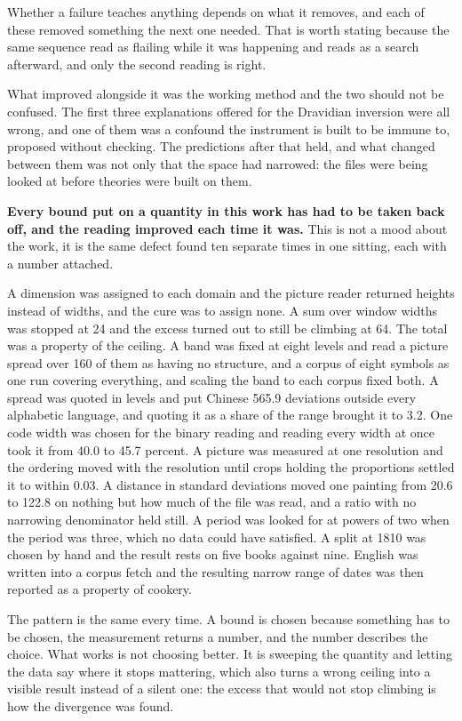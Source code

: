 Whether a failure teaches anything depends on what it removes, and each of these removed something the next one needed. That is worth stating because the same sequence read as flailing while it was happening and reads as a search afterward, and only the second reading is right.

What improved alongside it was the working method and the two should not be confused. The first three explanations offered for the Dravidian inversion were all wrong, and one of them was a confound the instrument is built to be immune to, proposed without checking. The predictions after that held, and what changed between them was not only that the space had narrowed: the files were being looked at before theories were built on them.

\textbf{Every bound put on a quantity in this work has had to be taken back off, and the reading improved each time it was.} This is not a mood about the work, it is the same defect found ten separate times in one sitting, each with a number attached.

A dimension was assigned to each domain and the picture reader returned heights instead of widths, and the cure was to assign none. A sum over window widths was stopped at 24 and the excess turned out to still be climbing at 64. The total was a property of the ceiling. A band was fixed at eight levels and read a picture spread over 160 of them as having no structure, and a corpus of eight symbols as one run covering everything, and scaling the band to each corpus fixed both. A spread was quoted in levels and put Chinese 565.9 deviations outside every alphabetic language, and quoting it as a share of the range brought it to 3.2. One code width was chosen for the binary reading and reading every width at once took it from 40.0 to 45.7 percent. A picture was measured at one resolution and the ordering moved with the resolution until crops holding the proportions settled it to within 0.03. A distance in standard deviations moved one painting from 20.6 to 122.8 on nothing but how much of the file was read, and a ratio with no narrowing denominator held still. A period was looked for at powers of two when the period was three, which no data could have satisfied. A split at 1810 was chosen by hand and the result rests on five books against nine. English was written into a corpus fetch and the resulting narrow range of dates was then reported as a property of cookery.

The pattern is the same every time. A bound is chosen because something has to be chosen, the measurement returns a number, and the number describes the choice. What works is not choosing better. It is sweeping the quantity and letting the data say where it stops mattering, which also turns a wrong ceiling into a visible result instead of a silent one: the excess that would not stop climbing is how the divergence was found.

